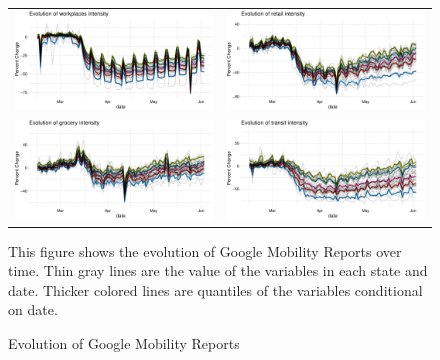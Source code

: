 \documentclass[11pt,reqno,letter]{amsart}
\theoremstyle{definition}
\begin{document}
\begin{figure}[ht]\caption{Evolution of Google Mobility Reports \label{fig:gmr}}
  \begin{minipage}{\linewidth}
    \begin{tabular}{cc}
      \includegraphics[width=0.5\linewidth]{tables_and_figures/workplaces}
      &
      \includegraphics[width=0.5\linewidth]{tables_and_figures/retail}
      \\
      \includegraphics[width=0.5\linewidth]{tables_and_figures/grocery}
      &
      \includegraphics[width=0.5\linewidth]{tables_and_figures/transit}
    \end{tabular}
  \end{minipage}
     \begin{flushleft}
      \footnotesize This figure shows the evolution of Google Mobility
      Reports over time. Thin gray lines are the value of the
      variables in each state and date. Thicker colored lines are
      quantiles of the variables conditional on date.     \end{flushleft}
\end{figure}
\end{document}
